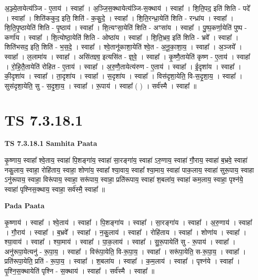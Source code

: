 \documentclass[17pt]{extarticle}
\begin{document}
अ॒ञ्ज्ये॒तायेत्य॑ञ्जि - ए॒ताय॑ । स्वाहा᳚ । अ॒ञ्जि॒स॒क्थायेत्य॑ञ्जि-स॒क्थाय॑ । स्वाहा᳚ । शि॒ति॒पद॒ इति॑ शिति - पदे᳚ । स्वाहा᳚ । शिति॑ककुद॒ इति॒ शिति॑ - क॒कु॒दे॒ । स्वाहा᳚ । शि॒ति॒रन्ध्रा॒येति॑ शिति - रन्ध्रा॑य । स्वाहा᳚ । शि॒ति॒पृ॒ष्ठायेति॑ शिति - पृ॒ष्ठाय॑ । स्वाहा᳚ । शि॒त्यꣳसा॒येति॑ शिति - अꣳसा॑य । स्वाहा᳚ । पु॒ष्प॒कर्णा॒येति॑ पुष्प - कर्णा॑य । स्वाहा᳚ । शि॒त्योष्ठा॒येति॑ शिति - ओष्ठा॑य । स्वाहा᳚ । शि॒ति॒भ्रव॒ इति॑ शिति - भ्रवे᳚ । स्वाहा᳚ । शिति॑भसद॒ इति॒ शिति॑ - भ॒स॒दे॒ । स्वाहा᳚ । श्वे॒तानू॑काशा॒येति॑ श्वे॒त - अ॒नू॒का॒शा॒य॒ । स्वाहा᳚ । अ॒ञ्जये᳚ । स्वाहा᳚ । ल॒लामा॑य । स्वाहा᳚ । असि॑तज्ञ्व॒ इत्यसि॑त - ज्ञ्॒वे॒ । स्वाहा᳚ । कृ॒ष्णै॒तायेति॑ कृष्ण - ए॒ताय॑ । स्वाहा᳚ । रो॒हि॒तै॒तायेति॑ रोहित - ए॒ताय॑ । स्वाहा᳚ । अ॒रु॒णै॒तायेत्य॑रुण - ए॒ताय॑ । स्वाहा᳚ । ई॒दृशा॑य । स्वाहा᳚ । की॒दृशा॑य । स्वाहा᳚ । ता॒दृशा॑य । स्वाहा᳚ । स॒दृशा॑य । स्वाहा᳚ । विस॑दृशा॒येति॒ वि-स॒दृ॒शा॒य॒ । स्वाहा᳚ । सुस॑दृशा॒येति॒ सु - स॒दृ॒शा॒य॒ । स्वाहा᳚ । रू॒पाय॑ । स्वाहा᳚ ( ) । सर्व॑स्मै । स्वाहा᳚ ॥  \newline





\section{ TS 7.3.18.1 }

\textbf{TS 7.3.18.1 } \newline
\textbf{Samhita Paata} \newline

कृ॒ष्णाय॒ स्वाहा᳚ श्वे॒ताय॒ स्वाहा॑ पि॒शङ्गा॑य॒ स्वाहा॑ सा॒रङ्गा॑य॒ स्वाहा॑ ऽरु॒णाय॒ स्वाहा॑ गौ॒राय॒ स्वाहा॑ ब॒भ्रवे॒ स्वाहा॑ नकु॒लाय॒ स्वाहा॒ रोहि॑ताय॒ स्वाहा॒ शोणा॑य॒ स्वाहा᳚ श्या॒वाय॒ स्वाहा᳚ श्या॒माय॒ स्वाहा॑ पाक॒लाय॒ स्वाहा॑ सुरू॒पाय॒ स्वाहा ऽनु॑रूपाय॒ स्वाहा॒ विरू॑पाय॒ स्वाहा॒ सरू॑पाय॒ स्वाहा॒ प्रति॑रूपाय॒ स्वाहा॑ श॒बला॑य॒ स्वाहा॑ कम॒लाय॒ स्वाहा॒ पृश्न॑ये॒ स्वाहा॑ पृश्निस॒क्थाय॒ स्वाहा॒ सर्व॑स्मै॒ स्वाहा᳚ ॥ \newline

\textbf{Pada Paata} \newline

कृ॒ष्णाय॑ । स्वाहा᳚ । श्वे॒ताय॑ । स्वाहा᳚ । पि॒शङ्गा॑य । स्वाहा᳚ । सा॒रङ्गा॑य । स्वाहा᳚ । अ॒रु॒णाय॑ । स्वाहा᳚ । गौ॒राय॑ । स्वाहा᳚ । ब॒भ्रवे᳚ । स्वाहा᳚ । न॒कु॒लाय॑ । स्वाहा᳚ । रोहि॑ताय । स्वाहा᳚ । शोणा॑य । स्वाहा᳚ । श्या॒वाय॑ । स्वाहा᳚ । श्या॒माय॑ । स्वाहा᳚ । पा॒क॒लाय॑ । स्वाहा᳚ । सु॒रू॒पायेति॑ सु - रू॒पाय॑ । स्वाहा᳚ । अनु॑रूपा॒येत्यनु॑ - रू॒पा॒य॒ । स्वाहा᳚ । विरू॑पा॒येति॒ वि-रू॒पा॒य॒ । स्वाहा᳚ । सरू॑पा॒येति॒ स-रू॒पा॒य॒ । स्वाहा᳚ । प्रति॑रूपा॒येति॒ प्रति॑ - रू॒पा॒य॒ । स्वाहा᳚ । श॒बला॑य । स्वाहा᳚ । क॒म॒लाय॑ । स्वाहा᳚ । पृश्न॑ये । स्वाहा᳚ । पृ॒श्नि॒स॒क्थायेति॑ पृश्नि - स॒क्थाय॑ । स्वाहा᳚ । सर्व॑स्मै । स्वाहा᳚ ॥  \newline
\end{document}
